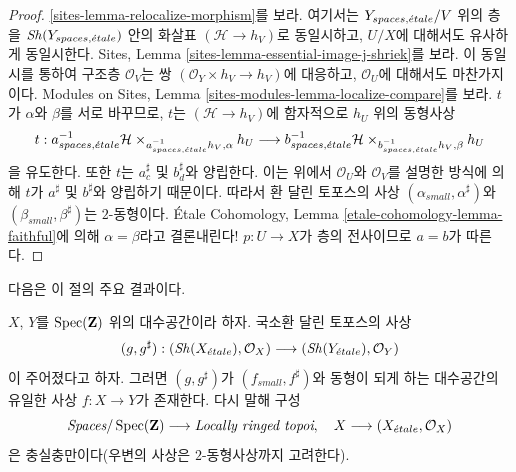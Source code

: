 \begin{proof}
\ref{sites-lemma-relocalize-morphism}를 보라. 여기서는
$Y_{spaces, {\acute{e}tale}}/V$ 위의 층을 $\mathop{\mathit{Sh}}\nolimits(Y_{spaces, {\acute{e}tale}})$ 안의 화살표
$(\mathcal{H} \to h_V)$로 동일시하고, $U/X$에 대해서도 유사하게
동일시한다. Sites, Lemma
\ref{sites-lemma-essential-image-j-shriek}를 보라. 이 동일시를 통하여
구조층 $\mathcal{O}_V$는 쌍
$(\mathcal{O}_Y \times h_V \to h_V)$에 대응하고,
$\mathcal{O}_U$에 대해서도 마찬가지이다. Modules on Sites, Lemma
\ref{sites-modules-lemma-localize-compare}를 보라.
$t$가 $\alpha$와 $\beta$를 서로 바꾸므로, $t$는
$(\mathcal{H} \to h_V)$에 함자적으로 $h_U$ 위의 동형사상
$$
t :
a_{spaces, {\acute{e}tale}}^{-1}\mathcal{H}
\times_{a_{spaces, {\acute{e}tale}}^{-1}h_V, \alpha}
h_U
\longrightarrow
b_{spaces, {\acute{e}tale}}^{-1}\mathcal{H}
\times_{b_{spaces, {\acute{e}tale}}^{-1}h_V, \beta}
h_U
$$
을 유도한다. 또한 $t$는 $a_c^\sharp$ 및 $b_d^\sharp$와 양립한다.
이는 위에서 $\mathcal{O}_U$와 $\mathcal{O}_V$를 설명한 방식에 의해
$t$가 $a^\sharp$ 및 $b^\sharp$와 양립하기 때문이다. 따라서 환 달린 토포스의
사상 $(\alpha_{small}, \alpha^\sharp)$와
$(\beta_{small}, \beta^\sharp)$는 $2$-동형이다.
\'Etale Cohomology, Lemma
\ref{etale-cohomology-lemma-faithful}에 의해 $\alpha = \beta$라고
결론내린다! $p : U \to X$가 층의 전사이므로 $a = b$가 따른다.
\end{proof}

\noindent
다음은 이 절의 주요 결과이다.

\begin{theorem}
\label{theorem-fully-faithful}
$X$, $Y$를 $\mathop{\mathrm{Spec}}(\mathbf{Z})$ 위의 대수공간이라 하자.
국소환 달린 토포스의 사상
$$
(g, g^\sharp) :
(\mathop{\mathit{Sh}}\nolimits(X_{\acute{e}tale}), \mathcal{O}_X)
\longrightarrow
(\mathop{\mathit{Sh}}\nolimits(Y_{\acute{e}tale}), \mathcal{O}_Y)
$$
이 주어졌다고 하자. 그러면 $(g, g^\sharp)$가
$(f_{small}, f^\sharp)$와 동형이 되게 하는 대수공간의 유일한 사상
$f : X \to Y$가 존재한다. 다시 말해 구성
$$
\textit{Spaces}/\mathop{\mathrm{Spec}}(\mathbf{Z})
\longrightarrow \textit{Locally ringed topoi},
\quad
X \longrightarrow (X_{\acute{e}tale}, \mathcal{O}_X)
$$
은 충실충만이다(우변의 사상은 $2$-동형사상까지 고려한다).
\end{theorem}

